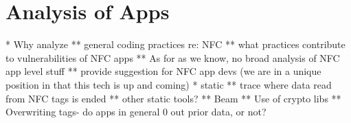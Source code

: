 \documentclass[12pt]{article}
\begin{document}
%
%
%
%
%

\section{Analysis of Apps}
* Why analyze
** general coding practices re: NFC
** what practices contribute to vulnerabilities of NFC apps
** As for as we know, no broad analysis of NFC app level stuff
** provide suggestion for NFC app devs (we are in a unique position in that this tech is up and coming)
* static
** trace where data read from NFC tags is ended
** other static tools?
** Beam
** Use of crypto libs
** Overwriting tags- do apps in general 0 out prior data, or not?
\end{document}
